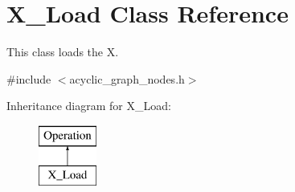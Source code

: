 \hypertarget{classX__Load}{}\section{X\+\_\+\+Load Class Reference}
\label{classX__Load}


This class loads the X.  




{\ttfamily \#include $<$acyclic\+\_\+graph\+\_\+nodes.\+h$>$}

Inheritance diagram for X\+\_\+\+Load\+:\begin{figure}[H]
\begin{center}
\leavevmode
\includegraphics[height=2.000000cm]{classX__Load}
\end{center}
\end{figure}

